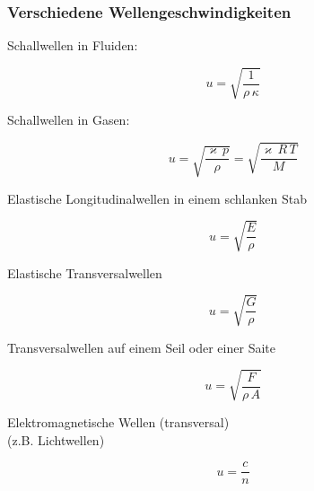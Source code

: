 
\subsubsection{Verschiedene Wellengeschwindigkeiten}

\begin{minipage}{0.45\linewidth}
Schallwellen in Fluiden: 
\end{minipage}
\hfill
\begin{minipage}{0.48\linewidth}
$$\boxed{ u = \sqrt{\frac{1}{\rho \, \kappa}} }$$
\end{minipage}


\begin{minipage}{0.45\linewidth}
Schallwellen in Gasen:
\end{minipage}
\hfill
\begin{minipage}{0.48\linewidth}
$$\boxed{ u = \sqrt{\frac{\varkappa \, p}{\rho}} = \sqrt{\frac{\varkappa \, R \, T}{M}} }$$
\end{minipage}


\begin{minipage}{0.45\linewidth}
Elastische Longitudinalwellen in einem schlanken Stab
\end{minipage}
\hfill
\begin{minipage}{0.48\linewidth}
$$\boxed{ u = \sqrt{\frac{E}{\rho}} }$$
\end{minipage}

\begin{minipage}{0.45\linewidth}
Elastische Transversalwellen
\end{minipage}
\hfill
\begin{minipage}{0.48\linewidth}
$$\boxed{ u = \sqrt{\frac{G}{\rho}} }$$
\end{minipage}

\begin{minipage}{0.45\linewidth}
Transversalwellen auf einem Seil oder einer Saite
\end{minipage}
\hfill
\begin{minipage}{0.48\linewidth}
$$\boxed{ u = \sqrt{\frac{F}{\rho \, A}} }$$ 
\end{minipage}

\begin{minipage}{0.45\linewidth}
Elektromagnetische Wellen (transversal) \\
(z.B. Lichtwellen)
\end{minipage}
\hfill
\begin{minipage}{0.48\linewidth}
$$\boxed{ u = \frac{c}{n} }$$ \\
\end{minipage}


